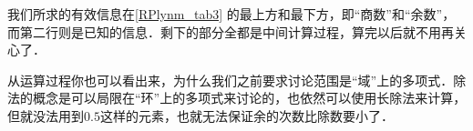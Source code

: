 我们所求的有效信息在\autoref{RPlynm_tab3} 的最上方和最下方，即“商数”和“余数”，而第二行则是已知的信息．剩下的部分全都是中间计算过程，算完以后就不用再关心了．

从运算过程你也可以看出来，为什么我们之前要求讨论范围是“域”上的多项式．除法的概念是可以局限在“环”上的多项式来讨论的，也依然可以使用长除法来计算，但就没法用到$0.5$这样的元素，也就无法保证余的次数比除数要小了．


















